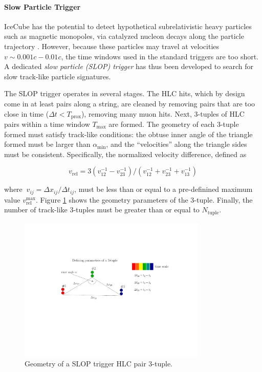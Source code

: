 \paragraph{Slow Particle Trigger}

IceCube has the potential to detect hypothetical subrelativistic heavy
particles such as magnetic monopoles, via catalyzed nucleon decays along
the particle trajectory \cite{IC3:monopole}.  However, because these
particles may travel at velocities $v \sim 0.001c - 0.01c$, the
time windows used in the standard triggers are too short.  A
dedicated \emph{slow particle (SLOP) trigger} has thus been developed to 
search for slow track-like particle signatures.

The SLOP trigger operates in several stages.  The HLC hits, which by
design come in at least pairs along a string, are cleaned by removing pairs
that are too close in time ($\Delta t < T_{\mathrm{prox}}$), removing
many muon hits.  Next, 3-tuples of HLC pairs within a time window
$T_{\mathrm{max}}$ are formed.  The geometry of each
3-tuple formed must satisfy track-like conditions: the obtuse inner angle
of the triangle formed must be larger than $\alpha_{\mathrm{min}}$, and the
``velocities'' along the triangle sides must be consistent.  Specifically,
the normalized velocity difference, defined as

\begin{equation}
  v_{\mathrm{rel}} =
  3(v^{-1}_{12} - v^{-1}_{23})/(v^{-1}_{12} + v^{-1}_{23} +
  v^{-1}_{13})
\end{equation}

\noindent where $\ v_{ij} = \Delta x_{ij}/\Delta t_{ij}$, must be less than
or equal to a pre-definined maximum value
$v_{\mathrm{rel}}^{\mathrm{max}}$.  Figure \ref{fig:slop} 
shows the geometry parameters of the 3-tuple.  Finally, the number of track-like
3-tuples must be greater than or equal to $N_{\mathrm{tuple}}$.  

\begin{figure}[!h]
 \centering
 \includegraphics[width=0.8\textwidth]{graphics/online/trigger/slop.pdf}
 \caption{Geometry of a SLOP trigger HLC pair 3-tuple.}
 \label{fig:slop}
\end{figure}

